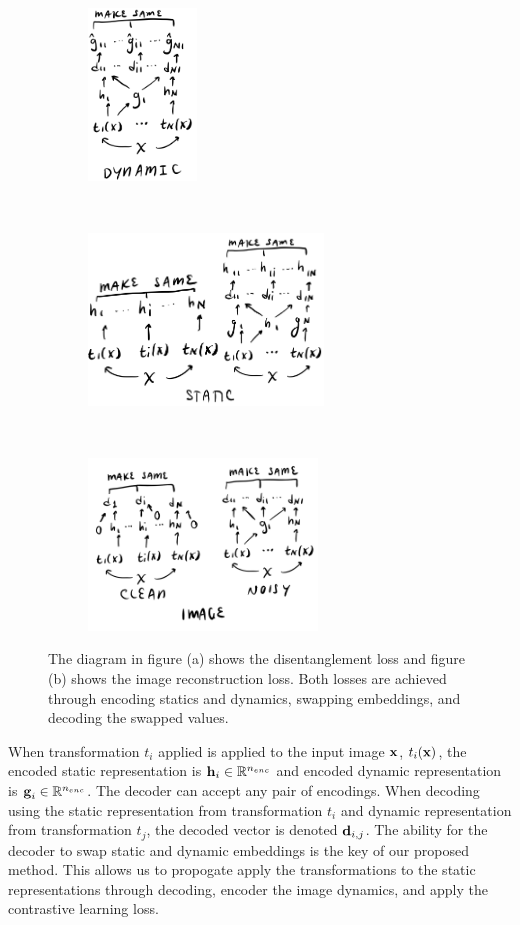 \documentclass[11pt]{article}
\begin{document}
\begin{figure}[h]
  \begin{subfigure}[b]{0.195\textwidth}
    \centering
    \includegraphics[height=1.8in]{figs/disentangle_loss_dynamic}
    \caption{}
  \end{subfigure}
  ~
  \begin{subfigure}[b]{0.395\textwidth}
    \centering
    \includegraphics[height=1.8in]{figs/disentangle_loss_static}
    \caption{}
  \end{subfigure}%
  ~
  \begin{subfigure}[b]{0.395\textwidth}
    \centering
    \includegraphics[height=1.8in]{figs/imgrec_loss}
    \caption{}
  \end{subfigure}%
  \caption{The diagram in figure (a) shows the disentanglement loss and figure (b) shows the image reconstruction loss. Both losses are achieved through encoding statics and dynamics, swapping embeddings, and decoding the swapped values.}
  \label{fig:disent_losses}
\end{figure}

When transformation $t_i$ applied is applied to the input image $\boldsymbol{\mathrm{x}}$, $t_i(\boldsymbol{\mathrm{x}})$, the encoded static representation is $\boldsymbol{\mathrm{h}}_i \in \mathbb{R}^{n_{enc}} $ and encoded dynamic representation is $\boldsymbol{\mathrm{g}}_i \in \mathbb{R}^{n_{enc}}$. The decoder can accept any pair of encodings. When decoding using the static representation from transformation $t_i$ and dynamic representation from transformation $t_j$, the decoded vector is denoted $\boldsymbol{\mathrm{d}}_{i,j}$. The ability for the decoder to swap static and dynamic embeddings is the key of our proposed method. This allows us to propogate apply the transformations to the static representations through decoding, encoder the image dynamics, and apply the contrastive learning loss.
\end{document}
